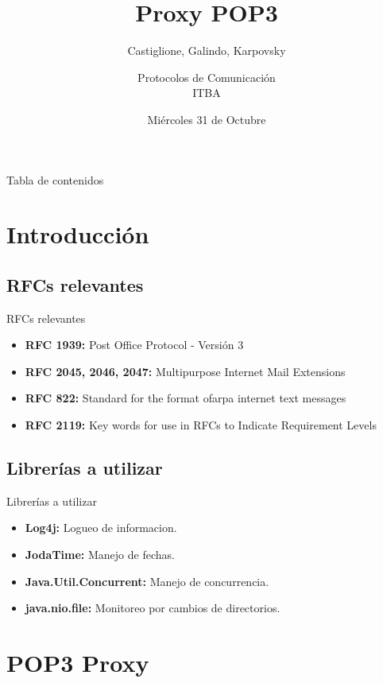 \documentclass{beamer}
\title{Proxy POP3}
\subtitle{Castiglione, Galindo, Karpovsky}
\author{Protocolos de Comunicación\\  ITBA}
\date{Miércoles 31 de Octubre}
\begin{document}
\frame{\titlepage}

\begin{frame}[allowframebreaks]{Tabla de contenidos}
\tableofcontents
\end{frame}

\section{Introducción}
\subsection{RFCs relevantes}
\begin{frame}{RFCs relevantes}
\begin{itemize}
    \item \textbf{RFC 1939:} Post Office Protocol - Versión 3
    \item \textbf{RFC 2045, 2046, 2047:} Multipurpose Internet Mail Extensions
    \item \textbf{RFC 822:} Standard for the format ofarpa internet text messages
    \item \textbf{RFC 2119:} Key words for use in RFCs to Indicate Requirement Levels
\end{itemize}
\end{frame}

\subsection{Librerías a utilizar}
\begin{frame}{Librerías a utilizar}
\begin{itemize}
    \item \textbf{Log4j:} Logueo de informacion.
    \item \textbf{JodaTime:} Manejo de fechas.
    \item \textbf{Java.Util.Concurrent:} Manejo de concurrencia.
    \item \textbf{java.nio.file:} Monitoreo por cambios de directorios.
\end{itemize} 
\end{frame}

\section{POP3 Proxy}
\end{document}
